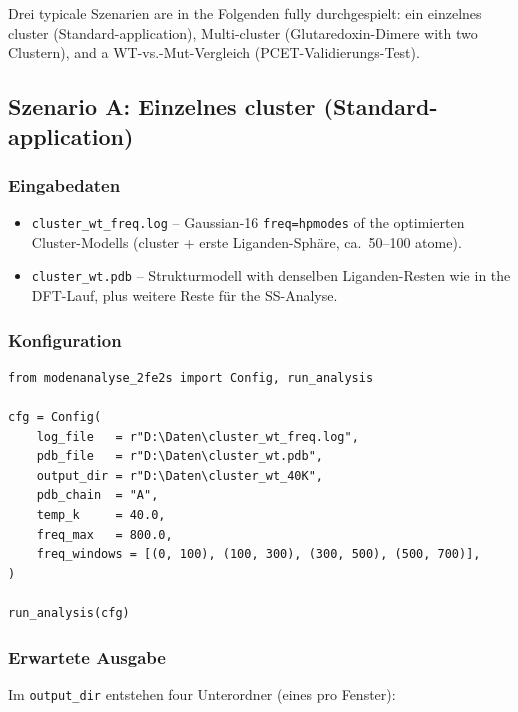 \documentclass[11pt,a4paper,twoside]{article}
\theoremstyle{remark}
\begin{document}
Drei typicale Szenarien are in the Folgenden fully durchgespielt:
ein einzelnes cluster (Standard-application), Multi-cluster (Glutaredoxin-Dimere with two
Clustern), and a WT-vs.-Mut-Vergleich (PCET-Validierungs-Test).

\subsection{Szenario A: Einzelnes cluster (Standard-application)}
\label{sec:workflow-single}

\subsubsection*{Eingabedaten}

\begin{itemize}
  \item \texttt{cluster\_wt\_freq.log} -- Gaussian-16 \texttt{freq=hpmodes}
        of the optimierten Cluster-Modells (cluster + erste Liganden-Sph\"are,
        ca.\ 50--100 atome).
  \item \texttt{cluster\_wt.pdb} -- Strukturmodell with denselben
        Liganden-Resten wie in the DFT-Lauf, plus weitere Reste f\"ur
        the SS-Analyse.
\end{itemize}

\subsubsection*{Konfiguration}

\begin{lstlisting}[style=python]
from modenanalyse_2fe2s import Config, run_analysis

cfg = Config(
    log_file   = r"D:\Daten\cluster_wt_freq.log",
    pdb_file   = r"D:\Daten\cluster_wt.pdb",
    output_dir = r"D:\Daten\cluster_wt_40K",
    pdb_chain  = "A",
    temp_k     = 40.0,
    freq_max   = 800.0,
    freq_windows = [(0, 100), (100, 300), (300, 500), (500, 700)],
)

run_analysis(cfg)
\end{lstlisting}

\subsubsection*{Erwartete Ausgabe}

Im \texttt{output\_dir} entstehen four Unterordner (eines pro Fenster):
\end{document}
